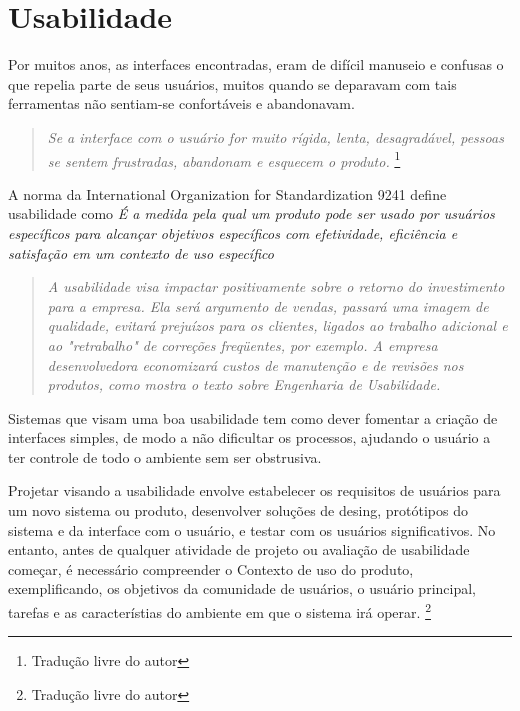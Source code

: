 \chapter{Usabilidade}

Por muitos anos, as interfaces encontradas, eram de difícil manuseio e confusas o que repelia parte de seus usuários, muitos quando se deparavam com tais ferramentas não sentiam-se confortáveis e abandonavam. \cite{usability_evaluation_learning}


\begin{quote} 
\emph{Se a interface com o usuário for muito rígida, lenta, desagradável, pessoas se sentem frustradas, abandonam e esquecem o produto.}
\cite{usability_evaluation_learning}\footnote{Tradução livre do autor}
\end{quote}

A norma da International Organization for Standardization 9241 define usabilidade como \emph{É a medida pela qual um produto pode ser usado por usuários específicos para alcançar objetivos específicos com efetividade, eficiência e satisfação em um contexto de uso específico}

\begin{quote}
\emph{A usabilidade visa impactar positivamente sobre o retorno do investimento para a empresa. Ela será argumento de vendas, passará uma imagem de qualidade, evitará prejuízos para os clientes, ligados ao trabalho adicional e ao "retrabalho" de correções freqüentes, por exemplo. A empresa desenvolvedora economizará custos de manutenção e de revisões nos produtos, como mostra o texto sobre Engenharia de Usabilidade.}
\cite{nielsen_usabilidade}
\end{quote}

Sistemas que visam uma boa usabilidade tem como dever fomentar a criação de interfaces simples, de modo a não dificultar os processos, ajudando o usuário a ter controle de todo o ambiente sem ser obstrusiva.

Projetar visando a usabilidade envolve estabelecer os requisitos de usuários para um novo sistema ou produto, desenvolver soluções de desing, protótipos do sistema e da interface com o usuário, e testar com os usuários significativos. No entanto, antes de qualquer atividade de projeto ou avaliação de usabilidade começar, é necessário compreender o Contexto de uso do produto, exemplificando, os objetivos da comunidade de usuários, o usuário principal, tarefas e as característias do ambiente em que o sistema irá operar.
\cite{maguire_context_of_use}\footnote{Tradução livre do autor}


